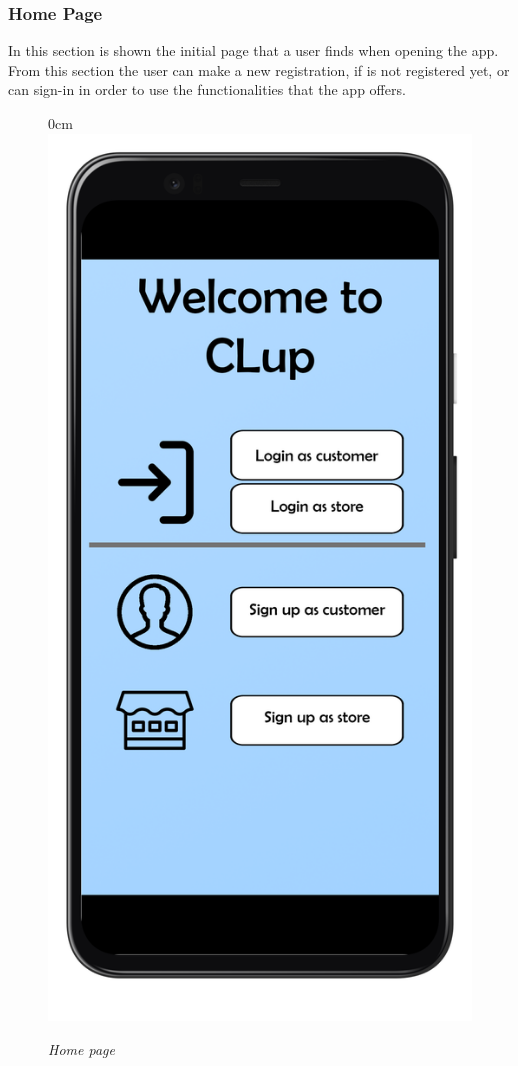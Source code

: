 \documentclass{article}
\begin{document}
		\subsubsection{Home Page}
		In this section is shown the initial page that a user finds when opening the app. From this section the user can make a new registration, if is not registered yet, or can sign-in in order to use the functionalities that the app offers.
		\bigskip
		\bigskip
		\begin{figure}[!h]
			\begin{adjustwidth} {0cm}{}
				\centering
				\includegraphics[scale=0.17]{../Mockups/InitialPage.png}\\
			\end{adjustwidth}
			\caption{\emph{Home page}}
		\end{figure}
		
\end{document}
